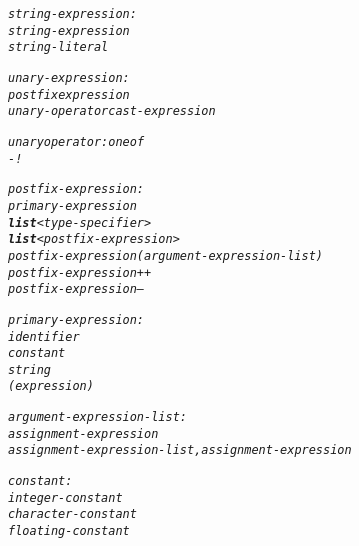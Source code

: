 \documentclass[12pt]{report}
\begin{document}
\begin{alltt}
     \textit{string-expression:}
          \textit{string-expression}
          \textit{string-literal}
          
     \textit{unary-expression:}
          \textit{postfix expression}
          \textit{unary-operator cast-expression}
          
     \textit{unary operator: one of}
          \textit{-    !}
          
     \textit{postfix-expression:}
          \textit{primary-expression}
          \textit{\textbf{list}<type-specifier>}
          \textit{\textbf{list}<postfix-expression>}
          \textit{postfix-expression ( argument-expression-list )}
          \textit{postfix-expression ++}
          \textit{postfix-expression --}
          
     \textit{primary-expression:}
          \textit{identifier}
          \textit{constant}
          \textit{string}
          \textit{( expression )}
          
     \textit{argument-expression-list:}
          \textit{assignment-expression}
          \textit{assignment-expression-list , assignment-expression}
          
     \textit{constant:}
          \textit{integer-constant}
          \textit{character-constant}
          \textit{floating-constant}
\end{alltt}
\end{document}
